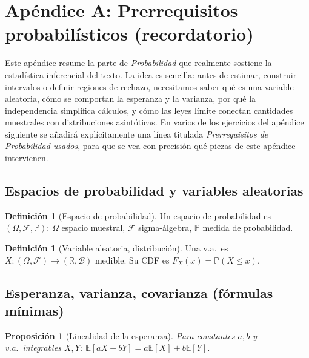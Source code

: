 \documentclass[11pt]{article}
\theoremstyle{plain}
\newtheorem{proposition}[theorem]{Proposición}
\theoremstyle{definition}
\newtheorem{definition}[theorem]{Definición}
\theoremstyle{remark}
\theoremstyle{solstyle}
\newcommand{\E}{\mathbb{E}}
\newcommand{\Pbb}{\mathbb{P}}
\newcommand{\R}{\mathbb{R}}
\newcommand{\1}{\mathbbm{1}}
\begin{document}
\appendix

\section{Apéndice A: Prerrequisitos probabilísticos (recordatorio)}\label{app:prereq}

Este apéndice resume la parte de \emph{Probabilidad} que realmente sostiene la estadística inferencial del texto.
La idea es sencilla: antes de estimar, construir intervalos o definir regiones de rechazo, necesitamos saber
qué es una variable aleatoria, cómo se comportan la esperanza y la varianza, por qué la independencia simplifica
cálculos, y cómo las leyes límite conectan cantidades muestrales con distribuciones asintóticas. En varios de los
ejercicios del apéndice siguiente se añadirá explícitamente una línea titulada
\emph{Prerrequisitos de Probabilidad usados}, para que se vea con precisión qué piezas de este apéndice intervienen.

\subsection{Espacios de probabilidad y variables aleatorias}\label{app:prereq-space}

\begin{definition}[Espacio de probabilidad]
Un espacio de probabilidad es $(\Omega,\mathcal{F},\Pbb)$: $\Omega$ espacio muestral, $\mathcal{F}$ sigma-álgebra,
$\Pbb$ medida de probabilidad.
\end{definition}

\begin{definition}[Variable aleatoria, distribución]
Una v.a.\ es $X:(\Omega,\mathcal{F})\to(\R,\mathcal{B})$ medible.
Su CDF es $F_X(x)=\Pbb(X\le x)$.
\end{definition}

\subsection{Esperanza, varianza, covarianza (fórmulas mínimas)}\label{app:prereq-moments}

\begin{proposition}[Linealidad de la esperanza]
Para constantes $a,b$ y v.a.\ integrables $X,Y$:
$\E[aX+bY]=a\E[X]+b\E[Y]$.
\end{proposition}
\end{document}

